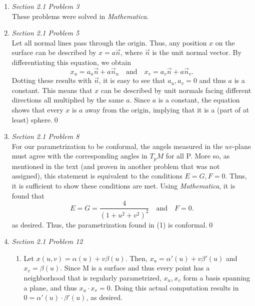 \documentclass{article}
\begin{document}
\begin{enumerate}
\item \textit{Section 2.1 Problem 3}\\

These problems were solved in \textit{Mathematica}.

\item \textit{Section 2.1 Problem 5}\\

Let all normal lines pass through the origin. 
Thus, any position $x$ on the surface can be described by $x = a\vec{n}$, where $\vec{n}$ is the unit normal vector.
By differentiating this equation, we obtain
\begin{equation*}
x_u = a_u\vec{n} + a\vec{n}_u \quad \textrm{and} \quad x_v = a_v\vec{n} + a\vec{n}_v.
\end{equation*}
Dotting these results with $\vec{n}$, it is easy to see that $a_u,a_v = 0$ and thus $a$ is a constant. 
This means that $x$ can be described by unit normals facing different directions all multiplied by the same $a$.
Since $a$ is a constant, the equation shows that every $x$ is $a$ away from the origin, implying that it is a (part of at least) sphere.\qed

\item \textit{Section 2.1 Problem 8}\\

For our parametrization to be conformal, the angels measured in the $uv$-plane must agree with the corresponding angles in $T_pM$ for all P. 
More so, as mentioned in the text (and proven in another problem that was not assigned), this statement is equivalent to the conditions $E = G, F = 0$.
Thus, it is sufficient to show these conditions are met. 
Using \textit{Mathematica}, it is found that 
\begin{equation*}
E = G = \frac{4}{(1+u^2+v^2)^2} \quad \textrm{and} \quad F = 0.
\end{equation*}
as desired.
Thus, the parametrization found in (1) is conformal.\qed

\item \textit{Section 2.1 Problem 12}\\
\begin{enumerate}

\item Let $x(u,v) = \alpha(u) + v\beta(u)$.
Then, $x_u = \alpha'(u) + v\beta'(u)$ and $x_v = \beta(u)$.
Since M is a surface and thus every point has a neighborhood that is regularly parametrized, $x_u,x_v$ form a basis spanning a plane, and thus $x_u\cdot x_v=0$. 
Doing this actual computation results in $0 = \alpha'(u)\cdot\beta'(u)$, as desired.


\end{enumerate}
\end{enumerate}
\end{document}
